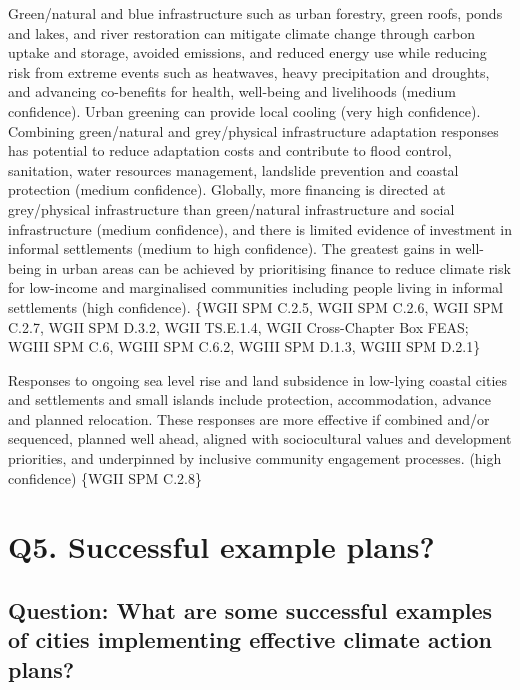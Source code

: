 \documentclass[
  letterpaper,
  DIV=11,
  numbers=noendperiod]{scrreprt}
\begin{document}
Green/natural and blue infrastructure such as urban forestry, green
roofs, ponds and lakes, and river restoration can mitigate climate
change through carbon uptake and storage, avoided emissions, and reduced
energy use while reducing risk from extreme events such as heatwaves,
heavy precipitation and droughts, and advancing co-benefits for health,
well-being and livelihoods (medium confidence). Urban greening can
provide local cooling (very high confidence). Combining green/natural
and grey/physical infrastructure adaptation responses has potential to
reduce adaptation costs and contribute to flood control, sanitation,
water resources management, landslide prevention and coastal protection
(medium confidence). Globally, more financing is directed at
grey/physical infrastructure than green/natural infrastructure and
social infrastructure (medium confidence), and there is limited evidence
of investment in informal settlements (medium to high confidence). The
greatest gains in well-being in urban areas can be achieved by
prioritising finance to reduce climate risk for low-income and
marginalised communities including people living in informal settlements
(high confidence). \{WGII SPM C.2.5, WGII SPM C.2.6, WGII SPM C.2.7,
WGII SPM D.3.2, WGII TS.E.1.4, WGII Cross-Chapter Box FEAS; WGIII SPM
C.6, WGIII SPM C.6.2, WGIII SPM D.1.3, WGIII SPM D.2.1\}

Responses to ongoing sea level rise and land subsidence in low-lying
coastal cities and settlements and small islands include protection,
accommodation, advance and planned relocation. These responses are more
effective if combined and/or sequenced, planned well ahead, aligned with
sociocultural values and development priorities, and underpinned by
inclusive community engagement processes. (high confidence) \{WGII SPM
C.2.8\}


\hypertarget{q5.-successful-example-plans}{%
\chapter{Q5. Successful example
plans?}\label{q5.-successful-example-plans}}

\hypertarget{question-what-are-some-successful-examples-of-cities-implementing-effective-climate-action-plans}{%
\section{Question: What are some successful examples of cities
implementing effective climate action
plans?}\label{question-what-are-some-successful-examples-of-cities-implementing-effective-climate-action-plans}}
\end{document}
